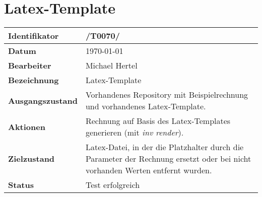 
\section{Latex-Template}

\renewcommand{\arraystretch}{1.5}

\begin{center}
 \begin{tabular}{|p{}|p{}|}
	\hline
	\textbf{Identifikator}  & /T0070/ \\
	\hline
	\textbf{Datum} & \today \\
	\hline
	\textbf{Bearbeiter} & Michael Hertel \\
	\hline
	\textbf{Bezeichnung} & Latex-Template \\
	\hline
	\textbf{Ausgangszustand} & 
		Vorhandenes Repository mit Beispielrechnung und vorhandenes Latex-Template. \\
	\hline
	\textbf{Aktionen} & 
		Rechnung auf Basis des Latex-Templates generieren (mit \textit{inv render}). \\
	\hline
	\textbf{Zielzustand} & 
		Latex-Datei, in der die Platzhalter durch die Parameter der Rechnung ersetzt oder bei nicht vorhanden Werten entfernt wurden. \\
	\hline
	\textbf{Status} & Test erfolgreich \\
	\hline
 \end{tabular}
\end{center}
